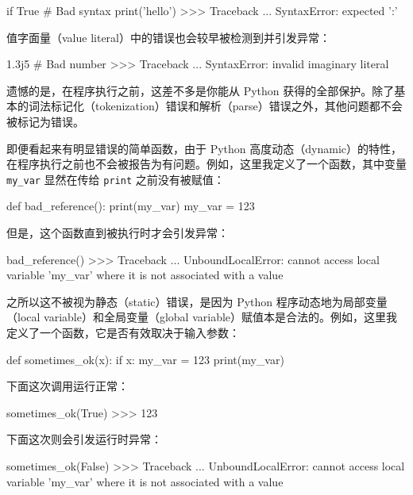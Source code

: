 \begin{codebox}[python]
if True  # Bad syntax
  print('hello')
>>>
Traceback ...
SyntaxError: expected ':'
\end{codebox}

值字面量（value literal）中的错误也会较早被检测到并引发异常：

\begin{codebox}[python]
1.3j5  # Bad number
>>>
Traceback ...
SyntaxError: invalid imaginary literal
\end{codebox}

遗憾的是，在程序执行之前，这差不多是你能从 Python 获得的全部保护。除了基本的词法标记化（tokenization）错误和解析（parse）错误之外，其他问题都不会被标记为错误。

即便看起来有明显错误的简单函数，由于 Python 高度动态（dynamic）的特性，在程序执行之前也不会被报告为有问题。例如，这里我定义了一个函数，其中变量 \texttt{my\_var} 显然在传给 \texttt{print} 之前没有被赋值：

\begin{codebox}[python]
def bad_reference():
    print(my_var)
    my_var = 123
\end{codebox}

但是，这个函数直到被执行时才会引发异常：

\begin{codebox}[python]
bad_reference()
>>>
Traceback ...
UnboundLocalError: cannot access local variable 'my_var'
where it is not associated with a value
\end{codebox}

之所以这不被视为静态（static）错误，是因为 Python 程序动态地为局部变量（local variable）和全局变量（global variable）赋值本是合法的。例如，这里我定义了一个函数，它是否有效取决于输入参数：

\begin{codebox}[python]
def sometimes_ok(x):
    if x:
        my_var = 123
    print(my_var)
\end{codebox}

下面这次调用运行正常：

\begin{codebox}[python]
sometimes_ok(True)
>>>
123
\end{codebox}

下面这次则会引发运行时异常：

\begin{codebox}[python]
sometimes_ok(False)
>>>
Traceback ...
UnboundLocalError: cannot access local variable 'my_var'
where it is not associated with a value
\end{codebox}

